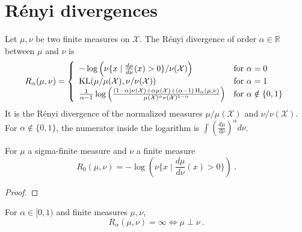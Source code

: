 \section{Rényi divergences}

\begin{definition}
  \label{def:Renyi}
  \leanok
  Let $\mu, \nu$ be two finite measures on $\mathcal X$. The Rényi divergence of order $\alpha \in \mathbb{R}$ between $\mu$ and $\nu$ is
  \begin{align*}
  R_\alpha(\mu, \nu) = \left\{
 \begin{array}{ll}
  - \log \left( \nu\{x \mid \frac{d \mu}{d \nu}(x) > 0\} / \nu(\mathcal X) \right) & \text{for } \alpha = 0
  \\
  \operatorname{KL}(\mu / \mu(\mathcal X), \nu / \nu(\mathcal X)) & \text{for } \alpha = 1
  \\
  \frac{1}{\alpha - 1} \log \left( \frac{(1 - \alpha) \nu(\mathcal X) + \alpha \mu(\mathcal X) + (\alpha - 1) \operatorname{H}_\alpha(\mu, \nu)}{\mu(\mathcal X)^\alpha \nu(\mathcal X)^{1 - \alpha}} \right) & \text{for } \alpha \notin \{0, 1\}
  \end{array}\right.
  \end{align*}
  It is the Rényi divergence of the normalized measures $\mu / \mu(\mathcal X)$ and $\nu / \nu(\mathcal X)$. For $\alpha \notin \{0, 1\}$, the numerator inside the logarithm is $\int \left(\frac{d \mu}{d \nu}\right)^\alpha d\nu$.
\end{definition}


\begin{lemma}
  \label{lem:renyiDiv_zero}
  \leanok
  For $\mu$ a sigma-finite measure and $\nu$ a finite measure 
  \[R_0(\mu, \nu) = - \log(\nu\{x \mid \frac{d \mu}{d \nu}(x) > 0\}) \: .\]
\end{lemma}

\begin{proof}\leanok
{}
\end{proof}


\begin{lemma}
  \label{lem:renyiDiv_eq_top_iff_mutuallySingular_of_lt_one}
  \leanok
  For $\alpha \in [0, 1)$ and finite measures $\mu, \nu$, 
  \[R_\alpha(\mu, \nu) = \infty \iff \mu \perp \nu \: .\]
\end{lemma}

